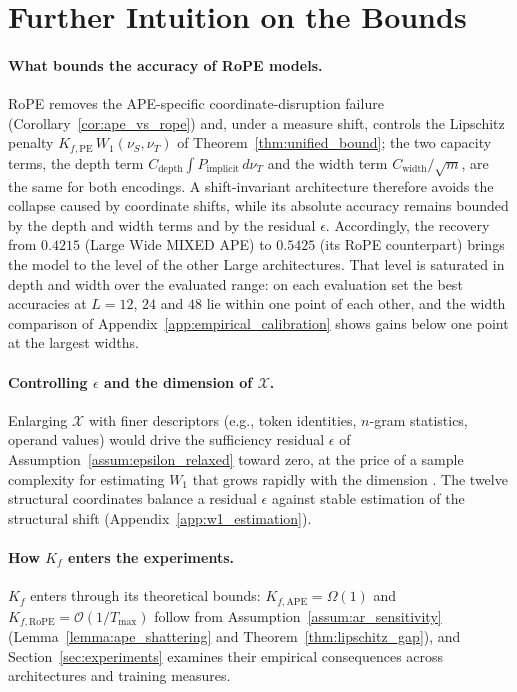 \section{Further Intuition on the Bounds} %
\label{app:intuition}

\paragraph{What bounds the accuracy of RoPE models.}
RoPE removes the APE-specific coordinate-disruption failure (Corollary~\ref{cor:ape_vs_rope}) and, under a measure shift, controls the Lipschitz penalty $K_{f,\mathrm{PE}}\,W_1(\nu_S,\nu_T)$ of Theorem~\ref{thm:unified_bound}; the two capacity terms, the depth term $C_{\mathrm{depth}}\int P_{\mathrm{implicit}}\,d\nu_T$ and the width term $C_{\mathrm{width}}/\sqrt{m}$, are the same for both encodings. A shift-invariant architecture therefore avoids the collapse caused by coordinate shifts, while its absolute accuracy remains bounded by the depth and width terms and by the residual $\epsilon$. Accordingly, the recovery from $0.4215$ (Large Wide MIXED APE) to $0.5425$ (its RoPE counterpart) brings the model to the level of the other Large architectures. That level is saturated in depth and width over the evaluated range: on each evaluation set the best accuracies at $L=12$, $24$ and $48$ lie within one point of each other, and the width comparison of Appendix~\ref{app:empirical_calibration} shows gains below one point at the largest widths.

\paragraph{Controlling $\epsilon$ and the dimension of $\mathcal{X}$.}
Enlarging $\mathcal{X}$ with finer descriptors (e.g., token identities, $n$-gram statistics, operand values) would drive the sufficiency residual $\epsilon$ of Assumption~\ref{assum:epsilon_relaxed} toward zero, at the price of a sample complexity for estimating $W_1$ that grows rapidly with the dimension \citep{weed2019sharp}. The twelve structural coordinates balance a residual $\epsilon$ against stable estimation of the structural shift (Appendix~\ref{app:w1_estimation}).

\paragraph{How $K_f$ enters the experiments.}
$K_f$ enters through its theoretical bounds: $K_{f,\mathrm{APE}}=\Omega(1)$ and $K_{f,\mathrm{RoPE}}=\mathcal{O}(1/T_{\max})$ follow from Assumption~\ref{assum:ar_sensitivity} (Lemma~\ref{lemma:ape_shattering} and Theorem~\ref{thm:lipschitz_gap}), and Section~\ref{sec:experiments} examines their empirical consequences across architectures and training measures.

